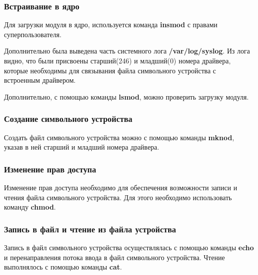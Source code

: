 \subsubsection{Встраивание в ядро}

\par Для загрузки модуля в ядро, используется команда \textbf{insmod} с правами суперпользователя. 



\par Дополнительно была выведена часть системного лога \textbf{/var/log/syslog}. Из лога видно, что были присвоены старший(246) и младший(0) номера драйвера, которые необходимы для связывания файла символьного устройства с встроенным драйвером.



\par Дополнительно, с помощью команды \textbf{lsmod}, можно проверить загрузку модуля.



\subsubsection{Создание символьного устройства}

\par Создать файл символьного устройства можно с помощью команды \textbf{mknod}, указав в ней старший и младший номера драйвера. 




\subsubsection{Изменение прав доступа}
Изменение прав доступа необходимо для обеспечения возможности записи и чтения файла символьного устройства. Для этого необходимо использовать команду \textbf{chmod}.



\subsubsection{Запись в файл и чтение из файла устройства}

\par Запись в файл символьного устройства осуществлялась с помощью команды \textbf{echo} и перенаправления потока ввода в файл символьного устройства. Чтение выполнялось с помощью команды \textbf{cat}. 

